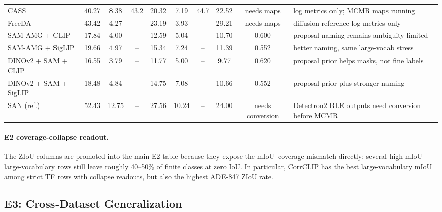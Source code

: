 \documentclass[11pt,a4paper]{article}
\begin{document}
\begin{table}[H]
\begin{adjustbox}{max width=\textwidth}
\begin{tabular}{l c c c c c c c c p{}}
CASS & 40.27 & 8.38 & 43.2 & 20.32 & 7.19 & 44.7 & 22.52 & needs maps & log metrics only; MCMR maps running \\
FreeDA & 43.42 & 4.27 & -- & 23.19 & 3.93 & -- & 29.21 & needs maps & diffusion-reference log metrics only \\
SAM-AMG + CLIP & 17.84 & 4.00 & -- & 12.59 & 5.04 & -- & 10.70 & 0.600 & proposal naming remains ambiguity-limited \\
SAM-AMG + SigLIP & 19.66 & 4.97 & -- & 15.34 & 7.24 & -- & 11.39 & 0.552 & better naming, same large-vocab stress \\
DINOv2 + SAM + CLIP & 16.55 & 3.79 & -- & 11.77 & 5.00 & -- & 9.77 & 0.620 & proposal prior helps masks, not fine labels \\
DINOv2 + SAM + SigLIP & 18.48 & 4.84 & -- & 14.75 & 7.08 & -- & 10.66 & 0.552 & proposal prior plus stronger naming \\
SAN (ref.) & 52.43 & 12.75 & -- & 27.56 & 10.24 & -- & 24.00 & needs conversion & Detectron2 RLE outputs need conversion before MCMR \\
\bottomrule
\end{tabular}
\end{adjustbox}
\end{table}


\paragraph{E2 coverage-collapse readout.}
The ZIoU columns are promoted into the main E2 table because they expose the mIoU--coverage mismatch directly: several high-mIoU large-vocabulary rows still leave roughly 40--50\% of finite classes at zero IoU. In particular, CorrCLIP has the best large-vocabulary mIoU among strict TF rows with collapse readouts, but also the highest ADE-847 ZIoU rate.

\subsection{E3: Cross-Dataset Generalization}
\end{document}
